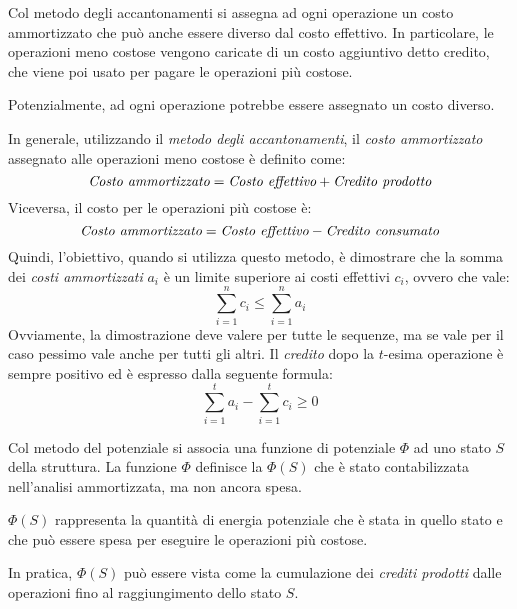 \newpage
\begin{definition}
    Col metodo degli accantonamenti si assegna ad ogni operazione un costo
    ammortizzato che può anche essere diverso dal costo effettivo. In particolare,
    le operazioni meno costose vengono caricate di un costo aggiuntivo detto
    credito, che viene poi usato per pagare le operazioni più costose.
\end{definition}
\begin{note}
    Potenzialmente, ad ogni operazione potrebbe essere assegnato un costo diverso.
\end{note}

\noindent
In generale, utilizzando il \emph{metodo degli accantonamenti}, il \emph{costo
ammortizzato} assegnato alle operazioni meno costose è definito come:
\[\emph{Costo ammortizzato}=\emph{Costo effettivo}+\emph{Credito prodotto}\]
Viceversa, il costo per le operazioni più costose è:
\[\emph{Costo ammortizzato}=\emph{Costo effettivo}-\emph{Credito consumato}\]
Quindi, l'obiettivo, quando si utilizza questo metodo, è dimostrare che la somma
dei \emph{costi ammortizzati} $a_i$ è un limite superiore ai costi effettivi
$c_i$, ovvero che vale:
\[\sum_{i=1}^nc_i\leq\sum_{i=1}^na_i\]
Ovviamente, la dimostrazione deve valere per tutte le sequenze, ma se vale per il
caso pessimo vale anche per tutti gli altri. Il \emph{credito} dopo la $t$-esima
operazione è sempre positivo ed è espresso dalla seguente formula:
\[\sum_{i=1}^ta_i-\sum_{i=1}^tc_i\geq0\]

\begin{definition}
    Col metodo del potenziale si associa una funzione di potenziale $\Phi$ ad
    uno stato $S$ della struttura. La funzione $\Phi$ definisce la  $\Phi(S)$ che è stato contabilizzata nell'analisi ammortizzata,
    ma non ancora spesa.
\end{definition}
\begin{note}
    $\Phi(S)$ rappresenta la quantità di energia potenziale che è stata
     in quello stato e che può essere spesa per eseguire le
    operazioni più costose.
\end{note}\noindent
In pratica, $\Phi(S)$ può essere vista come la cumulazione dei \emph{crediti
prodotti} dalle operazioni fino al raggiungimento dello stato $S$.

